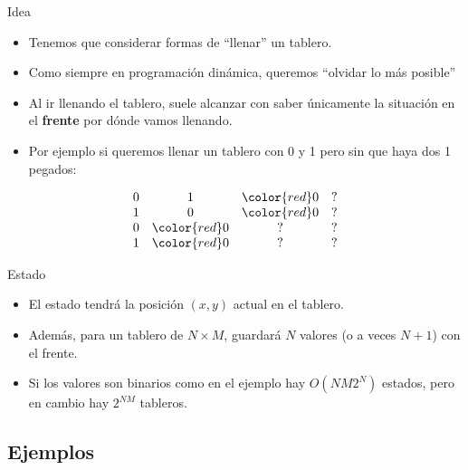 \documentclass{beamer}
\begin{document}
\begin{frame}{Idea}
    \begin{itemize}
		\item Tenemos que considerar formas de ``llenar'' un tablero.
		\item Como siempre en programación dinámica, queremos ``olvidar lo más posible''
		\item Al ir llenando el tablero, suele alcanzar con saber únicamente la situación en el \textbf{frente} por dónde vamos llenando.
		\item Por ejemplo si queremos llenar un tablero con 0 y 1 pero sin que haya dos 1 pegados:
    \end{itemize}
    $$\begin{array}{cccc}
		0 & 1 & \color{red}0 & ? \\
		1 & 0 & \color{red}0 & ? \\
		0 & \color{red}0 & ? & ? \\
		1 & \color{red}0 & ? & ? \\
    \end{array}$$
\end{frame}

\begin{frame}{Estado}
    \begin{itemize}
		\item El estado tendrá la posición $(x,y)$ actual en el tablero.
		\item Además, para un tablero de $N \times M$, guardará $N$ valores (o a veces $N+1$) con el frente.
		\item Si los valores son binarios como en el ejemplo hay $O(NM2^N)$ estados, pero en cambio hay $2^{NM}$ tableros.
	\end{itemize}
\end{frame}


\subsection{Ejemplos}
\end{document}
